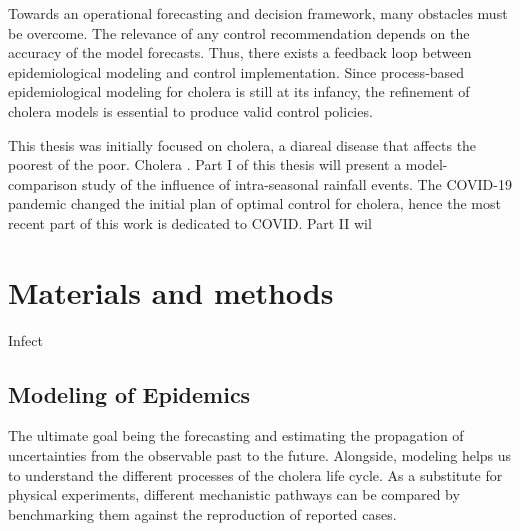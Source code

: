 Towards an operational forecasting and decision framework, many obstacles must be overcome. The relevance of any control recommendation depends on the accuracy of the model forecasts. Thus, there exists a feedback loop between epidemiological modeling and control implementation. Since process-based epidemiological modeling for cholera is still at its infancy, the refinement of cholera models is essential to produce valid control policies.

This thesis was initially focused on cholera, a diareal disease that affects the poorest of the poor. Cholera . Part I of this thesis will present a model-comparison study of the influence of intra-seasonal rainfall events. The COVID-19 pandemic changed the initial plan of optimal control for cholera, hence the most recent part of this work is dedicated to COVID. Part II wil


\chapter[Materials and methods]{Materials and methods} %

Infect

\section{Modeling of Epidemics}
The ultimate goal being  the forecasting and estimating the propagation of uncertainties from the observable past to the future. Alongside, modeling helps us to understand the different processes of the cholera life cycle. As a substitute for physical experiments, different mechanistic pathways can be compared by benchmarking them against the reproduction of reported cases. 

